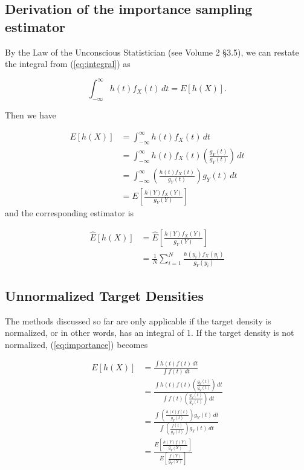 \subsection*{Derivation of the importance sampling estimator}

By the Law of the Unconscious Statistician (see Volume 2 \S 3.5), we can restate the integral from (\ref{eq:integral}) as

$$\int_{-\infty}^{\infty} h(t)f_X(t)\,dt = E[h(X)].$$

Then we have

\begin{equation*}
\begin{split}
E[h(X)] & = \int_{-\infty}^{\infty} h(t)f_X(t)\,dt \\
& = \int_{-\infty}^{\infty} h(t)f_X(t)\left ( \frac{g_Y(t)}{g_Y(t)} \right )\,dt \\
& = \int_{-\infty}^{\infty} \left ( \frac{h(t)f_X(t)}{g_Y(t)} \right )g_Y(t)\,dt \\
& = E\left [ \frac{h(Y)f_X(Y)}{g_Y(Y)}\right ]
\end{split}
\end{equation*}
and the corresponding estimator is

\begin{equation*}
\begin{split}
\widehat{E}[h(X)] & = \widehat{E}\left [ \frac{h(Y)f_X(Y)}{g_Y(Y)}\right ] \\
& = \frac{1}{N}\sum_{i = 1}^{N}\frac{h(y_i)f_X(y_i)}{g_Y(y_i)}
\end{split}
\end{equation*}

\subsection*{Unnormalized Target Densities} %

The methods discussed so far are only applicable if the target density is normalized, or in other words, has an integral of 1. If the target density is not normalized, (\ref{eq:importance}) becomes

\begin{equation*} \label{eq:unnormalized}
\begin{split}
E[h(X)] & = \frac{\int h(t)f(t)\,dt}{\int f(t)\,dt} \\
& = \frac{\int h(t)f(t) \left ( \frac{g_Y(t)}{g_Y(t)} \right )\,dt}{{\int f(t)} \left ( \frac{g_Y(t)}{g_Y(t)} \right )\,dt} \\
& = \frac{\int \left ( \frac{h(t)f(t)}{g_Y(t)} \right ) g_Y(t)\,dt}{\int \left ( \frac{f(t)}{g_Y(t)} \right ) g_Y(t)\,dt} \\
& = \frac{E\left [ \frac{h(Y)f(Y)}{g_Y(Y)}\right ]}{E\left [ \frac{f(Y)}{g_Y(Y)}\right ]}
\end{split}
\end{equation*}

